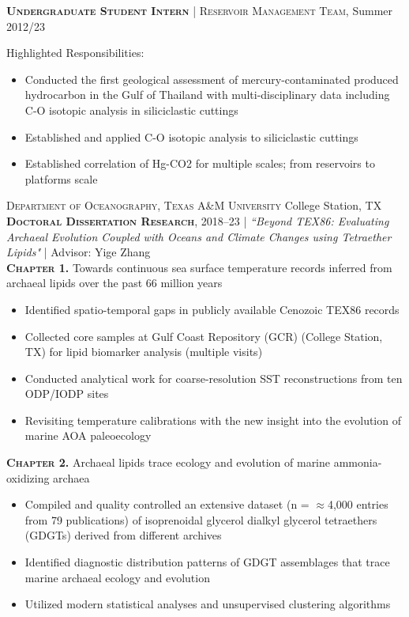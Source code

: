 \documentclass[10pt, letter]{article}
\newcommand{\margintext}[1]{\marginnote{\normalsize\textbf #1 |}}
\begin{document}
\textsc{\textbf{Undergraduate Student Intern}} | \textsc{Reservoir Management Team}, Summer 2012/23

\bigskip
Highlighted Responsibilities:
\begin{itemize}[leftmargin=*]
    \item Conducted the first geological assessment of mercury-contaminated produced hydrocarbon in the Gulf of Thailand with multi-disciplinary data including C-O isotopic analysis in siliciclastic cuttings
    \item Established and applied C-O isotopic analysis to siliciclastic cuttings
    \item Established correlation of Hg-CO2 for multiple scales; from reservoirs to platforms scale

\end{itemize}

\bigskip
\margintext{Previous Research Experience}
\textsc{Department of Oceanography, Texas A\&M University} \hfill College Station, TX \\
\textsc{\textbf{Doctoral Dissertation Research}}, 2018–23 | \textit{``Beyond TEX86: Evaluating Archaeal Evolution Coupled with Oceans and Climate Changes using Tetraether Lipids"} | Advisor: Yige Zhang \\

\textbf{\textsc{Chapter 1.}} Towards continuous sea surface temperature records inferred from archaeal lipids over the past 66 million years
\begin{itemize}[leftmargin=*]
    \item Identified spatio-temporal gaps in publicly available Cenozoic TEX86 records
    \item Collected core samples at Gulf Coast Repository (GCR) (College Station, TX) for lipid biomarker analysis (multiple visits)
    \item Conducted analytical work for coarse-resolution SST reconstructions from ten ODP/IODP sites
    \item Revisiting temperature calibrations with the new insight into the evolution of marine AOA paleoecology
\end{itemize}   

\bigskip
\textbf{\textsc{Chapter 2.}} Archaeal lipids trace ecology and evolution of marine ammonia-oxidizing archaea
\begin{itemize}[leftmargin=*]
    \item Compiled and quality controlled an extensive dataset (n = $\approx$4,000 entries from 79 publications) of isoprenoidal glycerol dialkyl glycerol tetraethers (GDGTs) derived from different archives
    \item Identified diagnostic distribution patterns of GDGT assemblages that trace marine archaeal ecology and evolution
    \item Utilized modern statistical analyses and unsupervised clustering algorithms
\end{itemize}    
\end{document}
